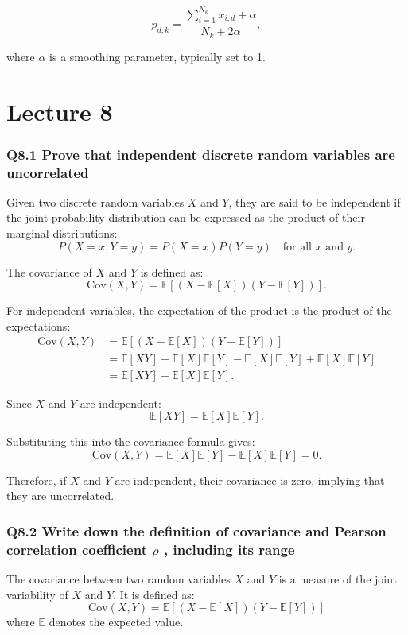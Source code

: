 \documentclass[11pt]{article}
\begin{document}
\[
p_{d,k} = \frac{\sum_{i=1}^{N_k} x_{i,d} + \alpha}{N_k + 2\alpha},
\]

where \( \alpha \) is a smoothing parameter, typically set to 1.

\part{Lecture 8}

\section{Q8.1 Prove that independent discrete random variables are uncorrelated}

Given two discrete random variables \( X \) and \( Y \), they are said to be independent if the joint probability distribution can be expressed as the product of their marginal distributions:
\[
P(X = x, Y = y) = P(X = x)P(Y = y) \quad \text{for all } x \text{ and } y.
\]

The covariance of \( X \) and \( Y \) is defined as:
\[
\text{Cov}(X, Y) = \mathbb{E}[(X - \mathbb{E}[X])(Y - \mathbb{E}[Y])].
\]

For independent variables, the expectation of the product is the product of the expectations:
\begin{align*}
\text{Cov}(X, Y) &= \mathbb{E}[(X - \mathbb{E}[X])(Y - \mathbb{E}[Y])] \\
&= \mathbb{E}[XY] - \mathbb{E}[X]\mathbb{E}[Y] - \mathbb{E}[X]\mathbb{E}[Y] + \mathbb{E}[X]\mathbb{E}[Y] \\
&= \mathbb{E}[XY] - \mathbb{E}[X]\mathbb{E}[Y].
\end{align*}

Since \( X \) and \( Y \) are independent:
\[
\mathbb{E}[XY] = \mathbb{E}[X]\mathbb{E}[Y].
\]

Substituting this into the covariance formula gives:
\[
\text{Cov}(X, Y) = \mathbb{E}[X]\mathbb{E}[Y] - \mathbb{E}[X]\mathbb{E}[Y] = 0.
\]

Therefore, if \( X \) and \( Y \) are independent, their covariance is zero, implying that they are uncorrelated.

\section{Q8.2 Write down the definition of covariance and Pearson correlation coefficient $\rho$ , including its range}

The covariance between two random variables \( X \) and \( Y \) is a measure of the joint variability of \( X \) and \( Y \). It is defined as:
\[
\text{Cov}(X, Y) = \mathbb{E}[(X - \mathbb{E}[X])(Y - \mathbb{E}[Y])]
\]
where \( \mathbb{E} \) denotes the expected value.
\end{document}
